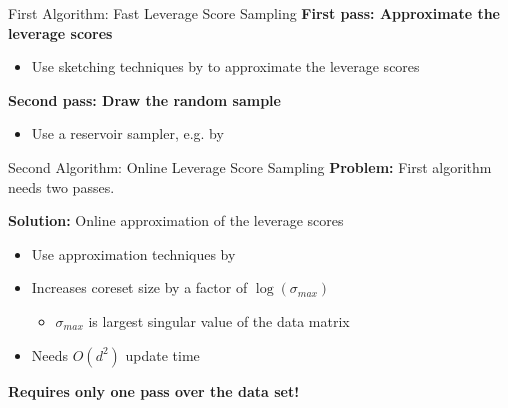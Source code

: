 \documentclass[gray]{beamer}
\begin{document}
\begin{frame}{First Algorithm: Fast Leverage Score Sampling}
    \textbf{First pass: Approximate the leverage scores}
    \begin{itemize}
        \item Use sketching techniques by \cite{woodruff-2017} to
              approximate the leverage scores
    \end{itemize}

    \vspace{\fill}

    \textbf{Second pass: Draw the random sample}
    \begin{itemize}
        \item Use a reservoir sampler, e.g. by \cite{reservoir-sampler}
    \end{itemize}

    \vspace{\fill}

    \centering
\end{frame}

\begin{frame}{Second Algorithm: Online Leverage Score Sampling}
    \textbf{Problem:} First algorithm needs two passes.

    \vspace{\fill}

    \textbf{Solution:} Online approximation of the leverage scores
    \begin{itemize}
        \item Use approximation techniques by \cite{tensor-factorization}
        \item Increases coreset size by a factor of $\log(\sigma_{max})$
              \begin{itemize}
                  \item $\sigma_{max}$ is largest singular value of the data matrix
              \end{itemize}
        \item Needs $O(d^2)$ update time
    \end{itemize}

    \vspace{\fill}

    \textbf{Requires only one pass over the data set!}
\end{frame}
\end{document}
